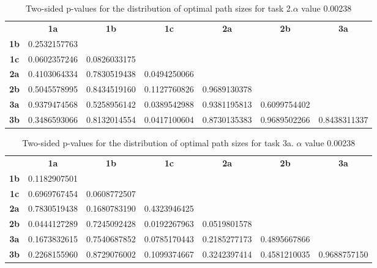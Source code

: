 \begin{table}[h!]
    \centering
    \begin{tabular}{ccccccc}
                & \textbf{1a}  & \textbf{1b}  & \textbf{1c}  & \textbf{2a}  & \textbf{2b}  & \textbf{3a}  \\
    \textbf{1b} & 0.2532157763 &              &              &              &              &              \\
    \textbf{1c} & 0.0602357246 & 0.0826033175 &              &              &              &              \\
    \textbf{2a} & 0.4103064334 & 0.7830519438 & 0.0494250066 &              &              &              \\
    \textbf{2b} & 0.5045578995 & 0.8434519160 & 0.1127760826 & 0.9689130378 &              &              \\
    \textbf{3a} & 0.9379474568 & 0.5258956142 & 0.0389542988 & 0.9381195813 & 0.6099754402 &              \\
    \textbf{3b} & 0.3486593066 & 0.8132014554 & 0.0417100604 & 0.8730135383 & 0.9689502266 & 0.8438311337
    \end{tabular}
    \caption{Two-sided p-values for the distribution of optimal path sizes for task 2.\(\alpha\) value 0.00238}
    \label{tab:exp2.pathsize2}
\end{table}

\newpage

\begin{table}[h!]
    \centering
    \begin{tabular}{ccccccc}
                & \textbf{1a}  & \textbf{1b}  & \textbf{1c}  & \textbf{2a}  & \textbf{2b}  & \textbf{3a}  \\
    \textbf{1b} & 0.1182907501 &              &              &              &              &              \\
    \textbf{1c} & 0.6969767454 & 0.0608772507 &              &              &              &              \\
    \textbf{2a} & 0.7830519438 & 0.1680783190 & 0.4323946425 &              &              &              \\
    \textbf{2b} & 0.0444127289 & 0.7245092428 & 0.0192267963 & 0.0519801578 &              &              \\
    \textbf{3a} & 0.1673832615 & 0.7540687852 & 0.0785170443 & 0.2185277173 & 0.4895667866 &              \\
    \textbf{3b} & 0.2268155960 & 0.8729076002 & 0.1099374667 & 0.3242397414 & 0.4581210035 & 0.9688757150
    \end{tabular}
    \caption{Two-sided p-values for the distribution of optimal path sizes for task 3a. \(\alpha\) value 0.00238}
    \label{tab:exp2.pathsize3a}
\end{table}

